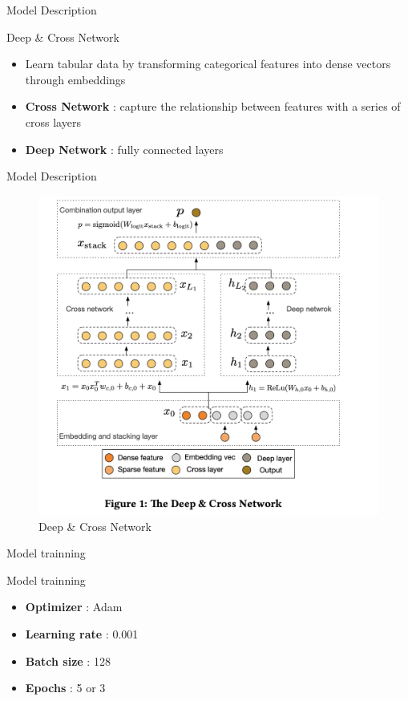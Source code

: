 \documentclass[compress,xcolor=table]{beamer}
\begin{document}
\begin{frame}{Model Description}
	\begin{block}{Deep \& Cross Network}
		
		\begin{itemize}
			\item Learn tabular data by transforming categorical features into dense vectors through embeddings
			\item \textbf{Cross Network} : capture the relationship between features with a series of cross layers 
			\item \textbf{Deep Network} : fully connected layers
		\end{itemize}
	\end{block}
	
\end{frame}
\begin{frame}{Model Description}
	\begin{figure}
		\centering
		\includegraphics[width=0.8\linewidth]{images/DCN_architecture.png}
		\caption{Deep \& Cross Network}
	\end{figure}
	
\end{frame}

\begin{frame}{Model trainning}
	\begin{block}{Model trainning}
		\begin{itemize}
			\item \textbf{Optimizer} : Adam
			\item \textbf{Learning rate} : 0.001
			\item \textbf{Batch size} : 128
			\item \textbf{Epochs} : 5 or 3
		\end{itemize}
	\end{block}

	
\end{frame}
\end{document}
